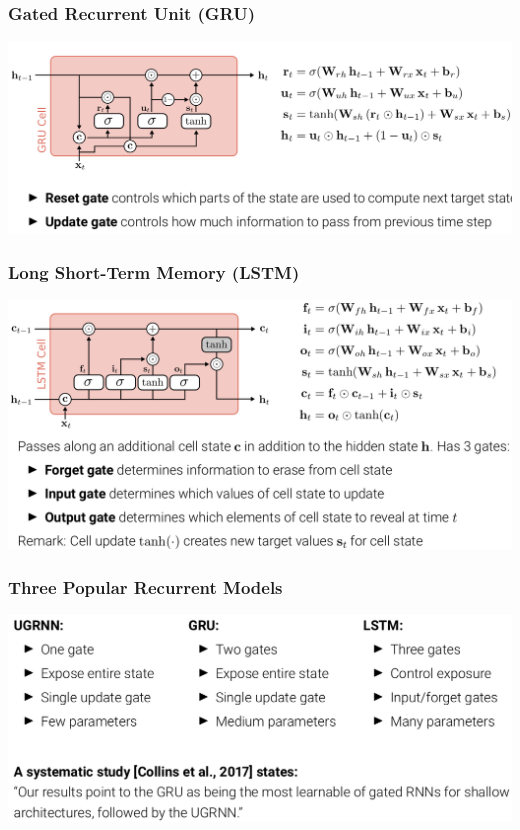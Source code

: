 \documentclass[10pt]{beamer}
\begin{document}
\begin{frame}
  \frametitle{Gated Recurrent Unit (GRU)}
\begin{center}
\includegraphics[width=\textwidth]{images/s20}
\end{center}
\end{frame}

\begin{frame}
  \frametitle{Long Short-Term Memory (LSTM)}
\begin{center}
\includegraphics[width=\textwidth]{images/s21}
\end{center}
\end{frame}

\begin{frame}
  \frametitle{Three Popular Recurrent Models}
\begin{center}
\includegraphics[width=\textwidth]{images/missing}
\end{center}
\end{frame}
\end{document}
